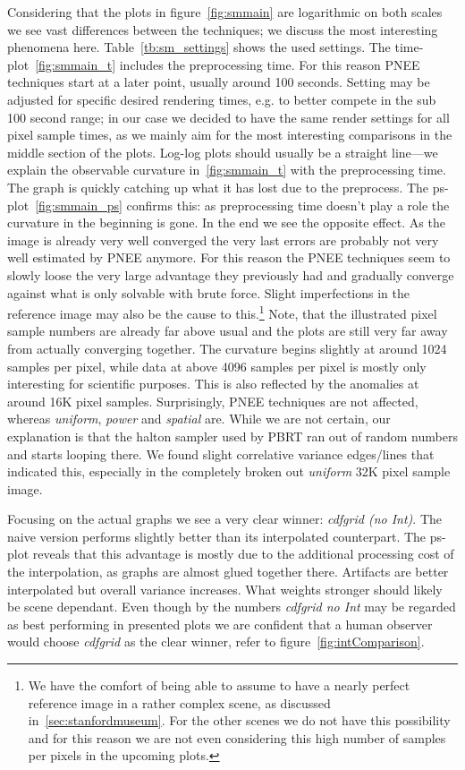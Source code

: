 Considering that the plots in figure~\ref{fig:smmain} are logarithmic on both scales we see vast differences between the techniques; we discuss the most interesting phenomena here. Table~\ref{tb:sm_settings} shows the used settings. The time-plot~\ref{fig:smmain_t} includes the preprocessing time. For this reason PNEE techniques start at a later point, usually around 100 seconds. Setting may be adjusted for specific desired rendering times, e.g. to better compete in the sub 100 second range; in our case we decided to have the same render settings for all pixel sample times, as we mainly aim for the most interesting comparisons in the middle section of the plots. Log-log plots should usually be a straight line---we explain the observable curvature in~\ref{fig:smmain_t} with the preprocessing time. The graph is quickly catching up what it has lost due to the preprocess. The ps-plot~\ref{fig:smmain_ps} confirms this: as preprocessing time doesn't play a role the curvature in the beginning is gone. In the end we see the opposite effect. As the image is already very well converged the very last errors are probably not very well estimated by PNEE anymore. For this reason the PNEE techniques seem to slowly loose the very large advantage they previously had and gradually converge against what is only solvable with brute force. Slight imperfections in the reference image may also be the cause to this.\footnote{We have the comfort of being able to assume to have a nearly perfect reference image in a rather complex scene, as discussed in~\ref{sec:stanfordmuseum}. For the other scenes we do not have this possibility and for this reason we are not even considering this high number of samples per pixels in the upcoming plots.} Note, that the illustrated pixel sample numbers are already far above usual and the plots are still very far away from actually converging together. The curvature begins slightly at around 1024 samples per pixel, while data at above 4096 samples per pixel is mostly only interesting for scientific purposes. This is also reflected by the anomalies at around 16K pixel samples. Surprisingly, PNEE techniques are not affected, whereas \textit{uniform}, \textit{power} and \textit{spatial} are. While we are not certain, our explanation is that the halton sampler used by PBRT ran out of random numbers and starts looping there. We found slight correlative variance edges/lines that indicated this, especially in the completely broken out \textit{uniform} 32K pixel sample image.

Focusing on the actual graphs we see a very clear winner: \textit{cdfgrid (no Int)}. The naive version performs slightly better than its interpolated counterpart. The ps-plot reveals that this advantage is mostly due to the additional processing cost of the interpolation, as graphs are almost glued together there. Artifacts are better interpolated but overall variance increases. What weights stronger should likely be scene dependant. Even though by the numbers \textit{cdfgrid no Int} may be regarded as best performing in presented plots we are confident that a human observer would choose \textit{cdfgrid} as the clear winner, refer to figure~\ref{fig:intComparison}.

